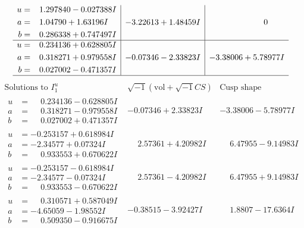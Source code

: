 \documentclass[1p]{elsarticle_modified}
\theoremstyle{definition}
\newcommand{\I}{\sqrt{-1}}
\begin{document}
$$\begin{array}{c|c|c}
\begin{aligned}
u &= \phantom{-}1.297840 - 0.027388 I \\
a &= \phantom{-}1.04790 + 1.63196 I \\
b &= \phantom{-}0.286338 + 0.747497 I\end{aligned}
 & -3.22613 + 1.48459 I & \phantom{-0.000000 } 0 \\ \hline\begin{aligned}
u &= \phantom{-}0.234136 + 0.628805 I \\
a &= \phantom{-}0.318271 + 0.979558 I \\
b &= \phantom{-}0.027002 - 0.471357 I\end{aligned}
 & -0.07346 - 2.33823 I & -3.38006 + 5.78977 I\\
 \hline 
 \end{array}$$\newpage$$\begin{array}{c|c|c}  
\text{Solutions to }I^u_{1}& \I (\text{vol} + \sqrt{-1}CS) & \text{Cusp shape}\\
 \hline 
\begin{aligned}
u &= \phantom{-}0.234136 - 0.628805 I \\
a &= \phantom{-}0.318271 - 0.979558 I \\
b &= \phantom{-}0.027002 + 0.471357 I\end{aligned}
 & -0.07346 + 2.33823 I & -3.38006 - 5.78977 I \\ \hline\begin{aligned}
u &= -0.253157 + 0.618984 I \\
a &= -2.34577 + 0.07324 I \\
b &= \phantom{-}0.933553 + 0.670622 I\end{aligned}
 & \phantom{-}2.57361 + 4.20982 I & \phantom{-}6.47955 - 9.14983 I \\ \hline\begin{aligned}
u &= -0.253157 - 0.618984 I \\
a &= -2.34577 - 0.07324 I \\
b &= \phantom{-}0.933553 - 0.670622 I\end{aligned}
 & \phantom{-}2.57361 - 4.20982 I & \phantom{-}6.47955 + 9.14983 I \\ \hline\begin{aligned}
u &= \phantom{-}0.310571 + 0.587049 I \\
a &= -4.65059 - 1.98552 I \\
b &= \phantom{-}0.509350 - 0.916675 I\end{aligned}
 & -0.38515 - 3.92427 I & \phantom{-}1.8807 - 17.6364 I \\ \hline\begin{aligned}

\end{aligned}
\end{array}$$
\end{document}
